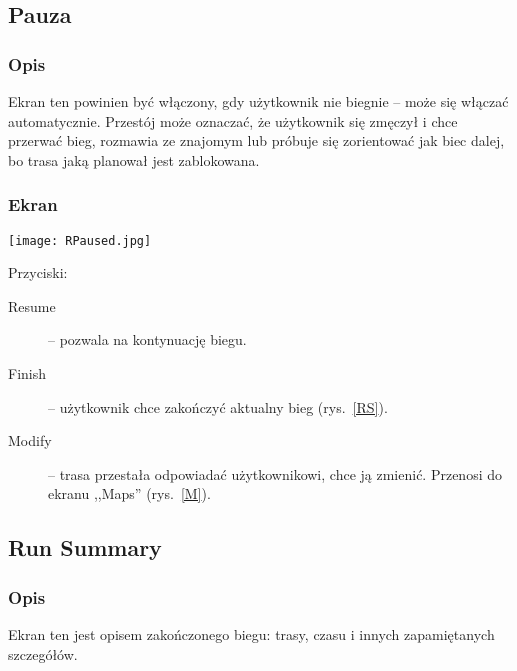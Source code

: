 \subsection{Pauza}
\subsubsection{Opis}
\noindent Ekran ten powinien być włączony, gdy użytkownik nie biegnie -- może się włączać automatycznie. Przestój może oznaczać, że użytkownik się zmęczył i chce przerwać bieg, rozmawia ze znajomym lub próbuje się zorientować jak biec dalej, bo trasa jaką planował jest zablokowana.
\subsubsection{Ekran}
\begin{minipage}{0.5\textwidth}
  \texttt{[image: RPaused.jpg]}
  \label{RP}
\end{minipage}
\begin{minipage}{0.5\textwidth}
Przyciski:\\
\begin{description}
  \item[Resume] -- pozwala na kontynuację biegu.
  \item[Finish] -- użytkownik chce zakończyć aktualny bieg (rys.~\ref{RS}).
  \item[Modify] -- trasa przestała odpowiadać użytkownikowi, chce ją zmienić. Przenosi do ekranu ,,Maps'' (rys.~\ref{M}).
\end{description}
\end{minipage}
\subsection{Run Summary}
\subsubsection{Opis}
\noindent Ekran ten jest opisem zakończonego biegu: trasy, czasu i innych zapamiętanych szczegółów.
